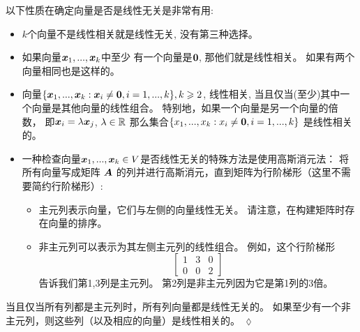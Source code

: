 \begin{remark}
    以下性质在确定向量是否是线性无关是非常有用:
    \begin{itemize}
        \item $k$个向量不是线性相关就是线性无关, 没有第三种选择。
        \item 如果向量$\boldsymbol{x}_1,...,\boldsymbol{x}_k$中至少
              有一个向量是$\boldsymbol{0}$, 那他们就是线性相关。
              如果有两个向量相同也是这样的。
        \item 向量$\{\boldsymbol{x}_1,...,\boldsymbol{x}_k : \boldsymbol{x}_i \neq \boldsymbol{0}, i = 1, ...,k\}, k \geqslant 2$,
              线性相关, 当且仅当(至少)其中一个向量是其他向量的线性组合。
              特别地，如果一个向量是另一个向量的倍数，
              即$\boldsymbol{x}_i = \lambda \boldsymbol{x}_j$,
              $\lambda \in \mathbb{R}$
              那么集合$\{x_1,..., x_k : x_i \neq \boldsymbol{0}, i = 1, ..., k\}$
              是线性相关的。
        \item 一种检查向量$\boldsymbol{x}_1,...,\boldsymbol{x}_k \in V$是否线性无关的特殊方法是使用高斯消元法：
              将所有向量写成矩阵 $\boldsymbol{A}$ 的列并进行高斯消元，直到矩阵为行阶梯形（这里不需要简约行阶梯形）:
              \begin{itemize}
                  \item 主元列表示向量，它们与左侧的向量线性无关。
                        请注意，在构建矩阵时存在向量的排序。
                  \item 非主元列可以表示为其左侧主元列的线性组合。
                        例如，这个行阶梯形
                        \begin{equation}
                            \begin{bmatrix}
                                1 & 3 & 0 \\
                                0 & 0 & 2
                            \end{bmatrix}
                        \end{equation}
                        告诉我们第1,3列是主元列。
                        第2列是非主元列因为它是第1列的3倍。
              \end{itemize}
    \end{itemize}
    当且仅当所有列都是主元列时，所有列向量都是线性无关的。
    如果至少有一个非主元列，则这些列（以及相应的向量）是线性相关的。
    \hfill $\lozenge$
\end{remark}


